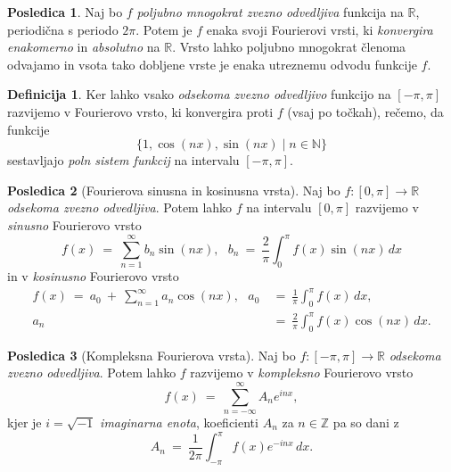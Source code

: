 \documentclass[11pt]{article}
\newcommand{\R}{\mathbb{R}}
\theoremstyle{definition}
\newtheorem{definicija}{Definicija}[section]
\theoremstyle{definition}
\theoremstyle{definition}
\theoremstyle{theorem}
\newtheorem*{posledica}{Posledica}
\begin{document}
\begin{posledica}

Naj bo $f$ \textit{poljubno mnogokrat zvezno odvedljiva} funkcija na $\R$, periodična s periodo $2\pi$. Potem je $f$ enaka svoji Fourierovi vrsti, ki \textit{\hbox{konvergira} enakomerno} in \textit{absolutno} na $\R$. Vrsto lahko poljubno mnogokrat členoma \hbox{odvajamo} in vsota tako dobljene vrste je enaka utreznemu odvodu funkcije $f$.

\end{posledica}
\vspace{0.5cm}

\begin{definicija}

Ker lahko vsako \textit{odsekoma zvezno odvedljivo} funkcijo na $[-\pi, \pi]$ razvijemo v Fourierovo vrsto, ki konvergira proti $f$ (vsaj po točkah), rečemo, da funkcije 
$$ \{ 1, \cos(nx), \sin(nx) \mid n \in \mathbb{N} \}$$
sestavljajo \textit{poln sistem funkcij} na intervalu $[-\pi, \pi]$.

\end{definicija}
\vspace{0.5cm}

\begin{posledica}[Fourierova sinusna in kosinusna vrsta]

Naj bo $f:[0, \pi] \rightarrow \mathbb{R}$ \textit{odsekoma zvezno odvedljiva}. Potem lahko $f$ na intervalu $[0, \pi]$ razvijemo v \textit{sinusno} Fourierovo vrsto
$$f(x) ~=~ \sum_{n=1}^{\infty} b_n \sin(nx), ~~~b_n ~=~ \frac{2}{\pi} \int_{0}^{\pi} f(x) \sin(nx)\,dx$$
in v \textit{kosinusno} Fourierovo vrsto
\begin{align*}
f(x) ~=~ a_0 ~+~ \sum_{n=1}^{\infty} a_n \cos(nx), ~~~a_0 ~&=~ \frac{1}{\pi} \int_{0}^{\pi} f(x)\,dx, \\ a_n ~&=~ \frac{2}{\pi} \int_{0}^{\pi} f(x) \cos(nx)\,dx.
\end{align*}

\end{posledica}
\vspace{0.5cm}

\begin{posledica}[Kompleksna Fourierova vrsta]

Naj bo $f:[-\pi, \pi] \rightarrow \mathbb{R}$ \textit{\hbox{odsekoma} zvezno odvedljiva}. Potem lahko $f$ razvijemo v \textit{kompleksno} Fourierovo vrsto
$$f(x) ~=~ \sum_{n=-\infty}^{\infty} A_n e^{inx},$$
kjer je $i = \sqrt{-1}$ \textit{imaginarna enota}, koeficienti $A_n$ za $n \in \mathbb{Z}$ pa so dani z
$$A_n ~=~ \frac{1}{2\pi} \int_{-\pi}^{\pi} f(x) e^{-inx}\,dx.$$

\end{posledica}
\vspace{0.5cm}
\end{document}
